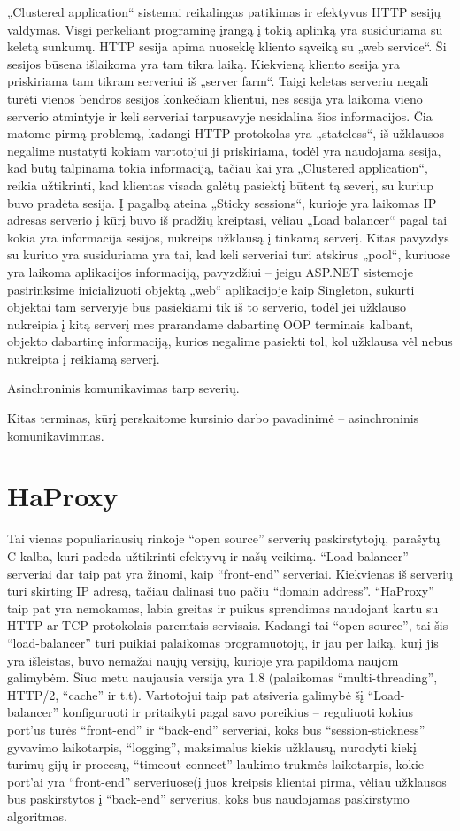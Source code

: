 \documentclass{VUMIFPSkursinis}
\begin{document}
„Clustered application“ sistemai reikalingas patikimas ir efektyvus HTTP sesijų valdymas. Visgi perkeliant programinę įrangą į tokią aplinką yra susiduriama su keletą sunkumų. HTTP sesija apima nuoseklę kliento sąveiką su „web service“. Ši sesijos būsena išlaikoma yra tam tikra laiką. Kiekvieną kliento sesija yra priskiriama tam tikram serveriui iš „server farm“. Taigi keletas serveriu negali turėti vienos bendros sesijos konkečiam klientui, nes sesija yra laikoma vieno serverio atmintyje ir keli serveriai tarpusavyje nesidalina šios informacijos. Čia matome pirmą problemą, kadangi HTTP protokolas yra „stateless“, iš užklausos negalime nustatyti kokiam vartotojui ji priskiriama, todėl yra naudojama sesija, kad būtų talpinama tokia informaciją, tačiau kai yra „Clustered application“, reikia užtikrinti, kad klientas visada galėtų pasiektį būtent tą severį, su kuriup buvo pradėta sesija. Į pagalbą ateina „Sticky sessions“, kurioje yra laikomas IP adresas serverio į kūrį buvo iš pradžių kreiptasi, vėliau „Load balancer“ pagal tai kokia yra informacija sesijos, nukreips užklausą į tinkamą serverį. Kitas pavyzdys su kuriuo yra susiduriama yra tai, kad keli serveriai turi atskirus „pool“, kuriuose yra laikoma aplikacijos informaciją, pavyzdžiui – jeigu ASP.NET sistemoje pasirinksime inicializuoti objektą „web“ aplikacijoje kaip Singleton, sukurti objektai tam serveryje bus pasiekiami tik iš to serverio, todėl jei užklauso nukreipia į kitą serverį mes prarandame dabartinę OOP terminais kalbant, objekto dabartinę informaciją, kurios negalime pasiekti tol, kol užklausa vėl nebus nukreipta į reikiamą serverį.

Asinchroninis komunikavimas tarp severių.

Kitas terminas, kūrį perskaitome kursinio darbo pavadinimė – asinchroninis komunikavimmas. 
\section{HaProxy}
Tai vienas populiariausių rinkoje “open source” serverių paskirstytojų, parašytų C kalba, kuri padeda užtikrinti efektyvų ir našų veikimą. “Load-balancer” serveriai dar taip pat yra žinomi, kaip “front-end” serveriai. Kiekvienas iš serverių turi skirting IP adresą, tačiau dalinasi tuo pačiu “domain address”. “HaProxy” taip pat yra nemokamas, labia greitas ir puikus sprendimas naudojant kartu su HTTP ar TCP protokolais paremtais servisais. Kadangi tai “open source”, tai šis “load-balancer” turi puikiai palaikomas programuotojų, ir jau per laiką, kurį jis yra išleistas, buvo nemažai naujų versijų, kurioje yra papildoma naujom galimybėm. Šiuo metu  naujausia versija yra 1.8 (palaikomas “multi-threading”, HTTP/2, “cache” ir t.t). Vartotojui taip pat atsiveria galimybė šį “Load-balancer” konfiguruoti ir pritaikyti pagal savo poreikius – reguliuoti kokius port’us turės “front-end” ir “back-end” serveriai, koks bus “session-stickness” gyvavimo laikotarpis, “logging”, maksimalus kiekis užklausų, nurodyti kiekį turimų gijų ir procesų, “timeout connect” laukimo trukmės laikotarpis, kokie port’ai yra “front-end” serveriuose(į juos kreipsis klientai pirma, vėliau užklausos bus paskirstytos į “back-end” serverius, koks bus naudojamas paskirstymo algoritmas.
\end{document}
